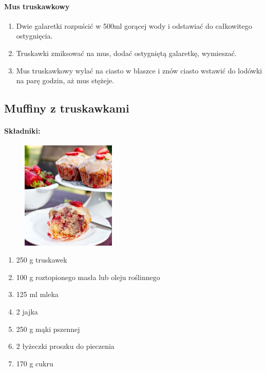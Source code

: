 \documentclass{article}
\begin{document}
    \paragraph{Mus truskawkowy}
    \begin{enumerate}
        \item Dwie galaretki rozpuścić w 500ml gorącej wody i odstawiać do
            całkowitego ostygnięcia.
        \item Truskawki zmiksować na mus, dodać ostygniętą galaretkę, wymieszać.
        \item Mus truskawkowy wylać na ciasto w blaszce i znów ciasto wstawić do
            lodówki na parę godzin, aż mus stężeje.
    \end{enumerate}
    \newpage


    \subsection{Muffiny z truskawkami}
    \bigskip
    \paragraph{Składniki:}
    \begin{figure}
        \includegraphics[width=0.4\textwidth]{muffiny_z_truskawkami.jpg}
    \end{figure}
    \begin{enumerate}
        \item 250 g truskawek
        \item 100 g roztopionego masła lub oleju roślinnego
        \item 125 ml mleka
        \item 2 jajka
        \item 250 g mąki pszennej
        \item 2 łyżeczki proszku do pieczenia
        \item 170 g cukru
    \end{enumerate}
\end{document}
